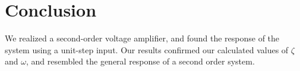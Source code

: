 \section{Conclusion}\label{sec:conclusion}
We realized a second-order voltage amplifier, and found the response of the system using a unit-step input. Our results confirmed our calculated values of $\zeta$ and $\omega$, and resembled the general response of a second order system.
